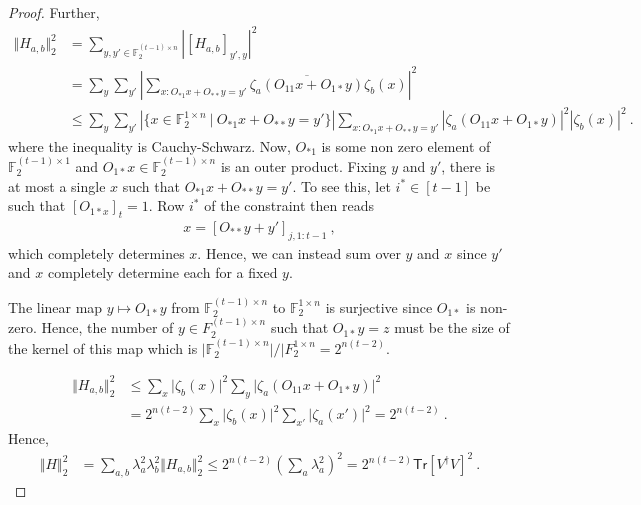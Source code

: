 \documentclass[11pt]{article}
\newcommand{\Tr}{\mathsf{Tr}}
\newcommand{\F}{\mathbb{F}}
\begin{document}
\begin{proof}
    Further,
    \begin{align}
        \Vert H_{a,b}\Vert_2^2 & = \sum_{y,y' \in \F_2^{(t-1)\times n}} \left\vert [H_{a,b}]_{y',y}\right\vert^2\\
        & = \sum_y \sum_{y'} \left\vert \sum_{x: O_{*1}x+O_{**}y = y'} \overline{\zeta_a(O_{11}x+O_{1*}y)}\zeta_b(x) \right\vert^2\\
        & \leq \sum_y \sum_{y'} \left\vert\{ x \in \F_2^{1\times n}\ \vert \ O_{*1}x+O_{**}y = y' \}\right\vert \sum_{x: O_{*1}x+O_{**}y = y'} \left\vert \zeta_a(O_{11}x+O_{1*}y) \right\vert^2\left\vert\zeta_b(x) \right\vert^2\ .
    \end{align}
    where the inequality is Cauchy-Schwarz. Now, $O_{*1}$ is some non zero element of $\F_{2}^{(t-1)\times 1}$ and $O_{1*}x \in \F_2^{(t-1) \times n}$ is an outer product. Fixing $y$ and $y'$, there is at most a single $x$ such that $O_{*1}x+O_{**}y = y'$. To see this, let $i^* \in [t-1]$ be such that $[O_{1*x}]_{t} =1$. Row $i^*$ of the constraint then reads
    \begin{align}
        x = [O_{**}y+y']_{j,1:t-1}\ ,
    \end{align}
    which completely determines $x$. Hence, we can instead sum over $y$ and $x$ since $y'$ and $x$ completely determine each for a fixed $y$.
    
    
    The linear map $y\mapsto O_{1*}y$ from $\F_2^{(t-1)\times n}$ to $\F_2^{1\times n}$ is surjective since $O_{1*}$ is non-zero. Hence, the number of $y\in F_{2}^{(t-1)\times n}$ such that $O_{1*}y = z$ must be the size of the kernel of this map which is $\vert \F_2^{(t-1)\times n} \vert / \vert F_{2}^{1\times n} = 2^{n(t-2)}$.

    
    \begin{align}
        \Vert H_{a,b}\Vert_2^2 & \leq \sum_x \vert \zeta_b(x)\vert^2 \sum_y \vert \zeta_a(O_{11}x+O_{1*}y)\vert^2 \\
        & =2^{n(t-2)}\sum_x \vert \zeta_b(x)\vert^2 \sum_{x'} \vert \zeta_a(x')\vert^2  = 2^{n(t-2)}\ .
    \end{align}
    Hence,
    \begin{align}
        \Vert H\Vert_2^2 & = \sum_{a,b} \lambda_a^2 \lambda_b^2 \Vert H_{a,b}\Vert_2^2 \leq 2^{n(t-2)} \left(\sum_{a}\lambda_a^2\right)^2 = 2^{n(t-2)}\Tr[V^\dagger V]^2\ .
    \end{align}
\end{proof}
\end{document}
